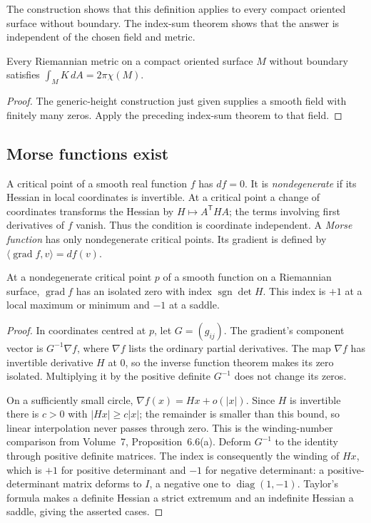 The construction shows that this definition applies to every compact oriented surface without boundary. The index-sum theorem shows that the answer is independent of the chosen field and metric.

\begin{corollary}\label{cor:gaussbonnet}
Every Riemannian metric on a compact oriented surface $M$ without boundary satisfies $\int_MK\,dA=2\pi\chi(M)$.
\end{corollary}

\begin{proof}
The generic-height construction just given supplies a smooth field with finitely many zeros. Apply the preceding index-sum theorem to that field.
\end{proof}

\subsection*{Morse functions exist}

A critical point of a smooth real function $f$ has $df=0$. It is \emph{nondegenerate} if its Hessian in local coordinates is invertible. At a critical point a change of coordinates transforms the Hessian by $H\mapsto A^{\mathsf T}HA$; the terms involving first derivatives of $f$ vanish. Thus the condition is coordinate independent. A \emph{Morse function} has only nondegenerate critical points. Its gradient is defined by $\langle\operatorname{grad}f,v\rangle=df(v)$.

\begin{lemma}\label{lem:morseindex}
At a nondegenerate critical point $p$ of a smooth function on a Riemannian surface, $\operatorname{grad}f$ has an isolated zero with index $\operatorname{sgn}\det H$. This index is $+1$ at a local maximum or minimum and $-1$ at a saddle.
\end{lemma}

\begin{proof}
In coordinates centred at $p$, let $G=(g_{ij})$. The gradient's component vector is $G^{-1}\nabla f$, where $\nabla f$ lists the ordinary partial derivatives. The map $\nabla f$ has invertible derivative $H$ at $0$, so the inverse function theorem makes its zero isolated. Multiplying it by the positive definite $G^{-1}$ does not change its zeros.

On a sufficiently small circle, $\nabla f(x)=Hx+o(|x|)$. Since $H$ is invertible there is $c>0$ with $|Hx|\ge c|x|$; the remainder is smaller than this bound, so linear interpolation never passes through zero. This is the winding-number comparison from Volume~7, Proposition~6.6(a). Deform $G^{-1}$ to the identity through positive definite matrices. The index is consequently the winding of $Hx$, which is $+1$ for positive determinant and $-1$ for negative determinant: a positive-determinant matrix deforms to $I$, a negative one to $\operatorname{diag}(1,-1)$. Taylor's formula makes a definite Hessian a strict extremum and an indefinite Hessian a saddle, giving the asserted cases.
\end{proof}

